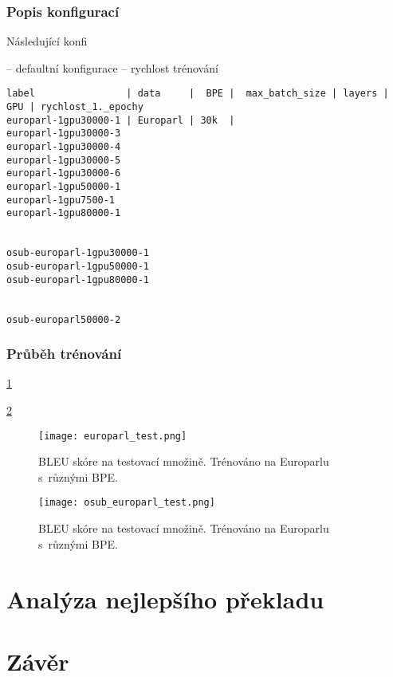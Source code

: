 \documentclass[a4]{article}
\begin{document}
\subsubsection{Popis konfigurací}

Následující konfi

-- defaultní konfigurace
-- rychlost trénování

\begin{itemize}
\begin{verbatim}
label                | data     |  BPE |  max_batch_size | layers | GPU | rychlost_1._epochy
europarl-1gpu30000-1 | Europarl | 30k  | 
europarl-1gpu30000-3
europarl-1gpu30000-4
europarl-1gpu30000-5
europarl-1gpu30000-6
europarl-1gpu50000-1
europarl-1gpu7500-1
europarl-1gpu80000-1


osub-europarl-1gpu30000-1
osub-europarl-1gpu50000-1
osub-europarl-1gpu80000-1


osub-europarl50000-2
\end{verbatim}

\end{itemize}

\subsubsection{Průběh trénování}

\ref{fig:europarl}

\ref{fig:osub}

\begin{figure}[h]
\centering
  \texttt{[image: europarl\_test.png]}
    \caption{BLEU skóre na testovací množině. Trénováno na Europarlu
	s~různými BPE.}
  \label{fig:europarl}
\end{figure}


\begin{figure}[h]
\centering
  \texttt{[image: osub\_europarl\_test.png]}
    \caption{BLEU skóre na testovací množině. Trénováno na Europarlu
	s~různými BPE.}
  \label{fig:osub}
\end{figure}



\section{Analýza nejlepšího překladu}

\section{Závěr}
\end{document}
